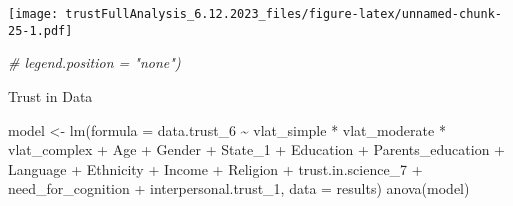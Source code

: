 \documentclass[
]{article}
\newenvironment{Shaded}{\begin{snugshade}}{\end{snugshade}}
\newcommand{\AttributeTok}[1]{\textcolor[rgb]{0.77,0.63,0.00}{#1}}
\newcommand{\CommentTok}[1]{\textcolor[rgb]{0.56,0.35,0.01}{\textit{#1}}}
\newcommand{\FunctionTok}[1]{\textcolor[rgb]{0.00,0.00,0.00}{#1}}
\newcommand{\NormalTok}[1]{#1}
\newcommand{\OtherTok}[1]{\textcolor[rgb]{0.56,0.35,0.01}{#1}}
\newcommand{\SpecialCharTok}[1]{\textcolor[rgb]{0.00,0.00,0.00}{#1}}
\begin{document}
\texttt{[image: trustFullAnalysis\_6.12.2023\_files/figure-latex/unnamed-chunk-25-1.pdf]}

\begin{Shaded}
\begin{Highlighting}[]
        \CommentTok{\# legend.position = "none")}
\end{Highlighting}
\end{Shaded}

Trust in Data

\begin{Shaded}
\begin{Highlighting}[]
\NormalTok{model }\OtherTok{\textless{}{-}} \FunctionTok{lm}\NormalTok{(}\AttributeTok{formula =}\NormalTok{ data.trust\_6 }\SpecialCharTok{\textasciitilde{}}\NormalTok{ vlat\_simple }\SpecialCharTok{*}\NormalTok{ vlat\_moderate }\SpecialCharTok{*}\NormalTok{ vlat\_complex }\SpecialCharTok{+}
\NormalTok{              Age }\SpecialCharTok{+}\NormalTok{ Gender }\SpecialCharTok{+}\NormalTok{ State\_1 }\SpecialCharTok{+}\NormalTok{ Education }\SpecialCharTok{+}\NormalTok{ Parents\_education }\SpecialCharTok{+}\NormalTok{ Language }\SpecialCharTok{+} 
\NormalTok{              Ethnicity }\SpecialCharTok{+}\NormalTok{ Income }\SpecialCharTok{+}\NormalTok{ Religion }\SpecialCharTok{+}\NormalTok{ trust.in.science\_7 }\SpecialCharTok{+} 
\NormalTok{              need\_for\_cognition }\SpecialCharTok{+}\NormalTok{ interpersonal.trust\_1,}
            \AttributeTok{data =}\NormalTok{ results)}
\FunctionTok{anova}\NormalTok{(model)}
\end{Highlighting}
\end{Shaded}
\end{document}
